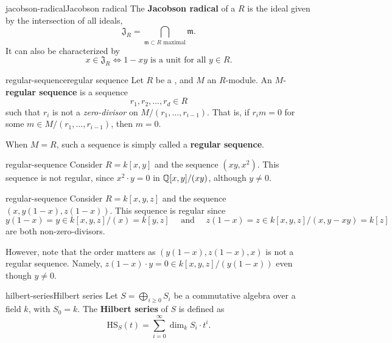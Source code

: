\begin{topic}{jacobson-radical}{Jacobson radical}
     The \textbf{Jacobson radical} of a  $R$ is the ideal given by the intersection of all  ideals,
     \[ \mathfrak{J}_R = \bigcap_{\mathfrak{m} \subset R \text{ maximal}} \mathfrak{m} . \]
     It can also be characterized by
     \[ x \in \mathfrak{J}_R \iff 1 - xy \text{ is a unit for all } y \in R . \]
\end{topic}

\begin{topic}{regular-sequence}{regular sequence}
    Let $R$ be a , and $M$ an $R$-module. An $M$-\textbf{regular sequence} is a sequence
    \[ r_1, r_2, \ldots, r_d \in R \]
    such that $r_i$ is not a \textit{zero-divisor} on $M/(r_1, \ldots, r_{i - 1})$. That is, if $r_i m = 0$ for some $m \in M / (r_1, \ldots, r_{i - 1})$, then $m = 0$.
    
    When $M = R$, such a sequence is simply called a \textbf{regular sequence}.
\end{topic}

\begin{example}{regular-sequence}
    Consider $R = k[x, y]$ and the sequence $(xy, x^2)$. This sequence is not regular, since $x^2 \cdot y = 0$ in $\mathbb{Q}[x, y] / (xy)$, although $y \ne 0$.
\end{example}

\begin{example}{regular-sequence}
    Consider $R = k[x, y, z]$ and the sequence $(x, y(1 - x), z(1 - x))$. This sequence is regular since
    \[ y(1 - x) = y \in k[x, y, z]/(x) = k[y, z] \quad \text{ and } \quad z(1 - x) = z \in k[x, y, z]/(x, y - xy) = k[z] \]
    are both non-zero-divisors.
    
    However, note that the order matters as $(y(1 - x), z(1 - x), x)$ is not a regular sequence. Namely, $z(1 - x) \cdot y = 0 \in k[x, y, z] / (y(1 - x))$ even though $y \ne 0$.
\end{example}

\begin{topic}{hilbert-series}{Hilbert series}
    Let $S = \bigoplus_{i \ge 0} S_i$ be a   commutative algebra over a field $k$, with $S_0 = k$. The \textbf{Hilbert series} of $S$ is defined as
    \[ \text{HS}_S(t) = \sum_{i = 0}^{\infty} \dim_k S_i \cdot t^i . \]
\end{topic}

